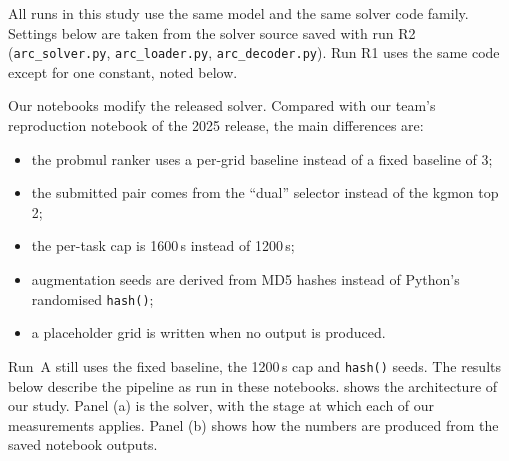 \documentclass[11pt]{article}
\newcommand{\code}[1]{\texttt{#1}}
\newcommand{\R}[1]{R#1}
\begin{document}
All runs in this study use the same model and the same solver code family. Settings below are taken from the solver source saved with run \R{2} (\code{arc\_solver.py}, \code{arc\_loader.py}, \code{arc\_decoder.py}). Run \R{1} uses the same code except for one constant, noted below.

Our notebooks modify the released solver. Compared with our team's reproduction notebook of the 2025 release, the main differences are:
\begin{itemize}
\item the probmul ranker uses a per-grid baseline instead of a fixed baseline of 3;
\item the submitted pair comes from the ``dual'' selector instead of the kgmon top 2;
\item the per-task cap is 1600\,s instead of 1200\,s;
\item augmentation seeds are derived from MD5 hashes instead of Python's randomised \code{hash()};
\item a placeholder grid is written when no output is produced.
\end{itemize}
Run~A still uses the fixed baseline, the 1200\,s cap and \code{hash()} seeds.
The results below describe the pipeline as run in these notebooks.
 shows the architecture of our study. Panel (a) is the solver, with the stage at which each of our measurements applies. Panel (b) shows how the numbers are produced from the saved notebook outputs.
\end{document}
